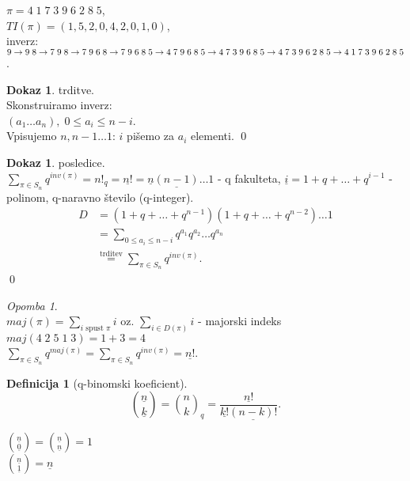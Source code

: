 \documentclass[a4paper, 12pt]{book}
\theoremstyle{definition}
\newtheorem{defn}[counter]{Definicija}
\newtheorem{pro}[counter]{Dokaz}
\theoremstyle{remark}
\newtheorem*{rem}{Opomba}
\begin{document}
$\pi = 4 \; 1 \; 7 \; 3 \; 9 \; 6 \; 2 \; 8 \; 5$, \\
$TI(\pi) = (1, 5, 2, 0, 4, 2, 0, 1, 0)$, \\
inverz: $9 \to 9 \; 8 \to 7 \; 9 \; 8 \to 7 \; 9 \; 6 \; 8 \to 7 \; 9 \; 6 \; 8 \; 5 \to 4 \; 7 \; 9 \; 6 \; 8 \; 5 \\
\to 4 \; 7 \; 3 \; 9 \; 6 \; 8 \; 5 \to 4 \; 7 \; 3 \; 9 \; 6 \; 2 \; 8 \; 5 \to 4 \;  1 \; 7 \; 3 \; 9 \; 6 \; 2 \; 8 \; 5$.
\begin{pro} trditve. \\
  Skonstruiramo inverz: \\
  $(a_1 \dots a_n), \; 0 \leq a_i \leq n-i$. \\
  Vpisujemo $n, n-1 \dots 1$: $i$ pišemo za $a_i$ elementi.
  \qed
\end{pro}
\begin{pro} posledice. \\
  $\sum_{\pi \in S_n} q^{inv(\pi)} = n!_q = \underline{n!} = \underline{n} \underline{(n-1)} \dots 1$ - q fakulteta,
  $\underline{i} = 1 + q + \dots + q^{i-1}$ - polinom, q-naravno število (q-integer). \\
  \begin{align*}
    D &= (1 + q + \dots + q^{n-1}) (1 + q + \dots + q^{n-2}) \dots 1 \\
    &= \sum_{0 \leq a_i \leq n-i} q^{a_1} q^{a_2} \dots q^{a_n} \\
    &\stackrel{\text{trditev}}{=} \sum_{\pi \in S_n} q^{inv(\pi)}.
  \end{align*}
  \qed
\end{pro}
\begin{rem} \text{} \\
  $maj(\pi) = \sum_{i \text{ spust } \pi} i$ oz. $\sum_{i \in D(\pi)} i$ - majorski indeks \\
  $maj(4 \; 2 \; 5 \; 1 \; 3) = 1 + 3 = 4$ \\
  $\sum_{\pi \in S_n} q^{maj(\pi)} = \sum_{\pi \in S_n} q^{inv(\pi)} = \underline{n!}$.
\end{rem}
\begin{defn}[q-binomski koeficient]
  \begin{equation*}
    \binom{\underline{n}}{\underline{k}} = \binom{n}{k}_q = \frac{\underline{n!}}{\underline{k!} \underline{(n-k)!}}.
  \end{equation*}
\end{defn}
$\binom{\underline{n}}{\underline{0}} = \binom{\underline{n}}{\underline{n}} = 1$ \\
$\binom{\underline{n}}{\underline{1}} = \underline{n}$
\end{document}

